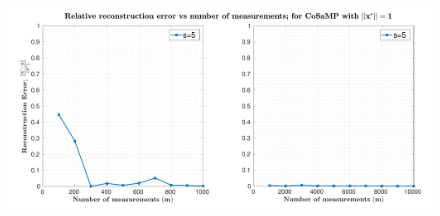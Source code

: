  
\begin{figure}[t]
	\begin{center}
		\includegraphics[width=\linewidth]{./fig/plot-1-1.pdf}
	\end{center}
	\caption{}
	\label{fig:plot-1-1}
\end{figure}

